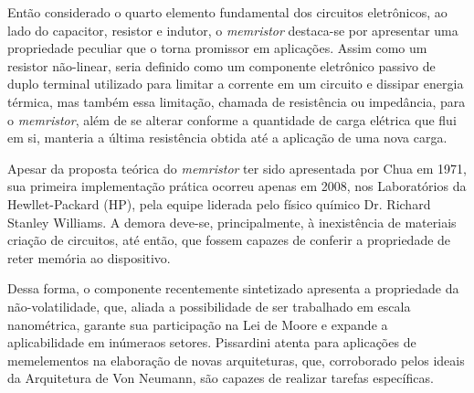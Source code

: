 \documentclass{ceel}
\begin{document}
\begin{multicols}{2}
Então considerado o quarto elemento fundamental dos circuitos eletrônicos, ao lado do capacitor, resistor e indutor, o \emph{memristor} destaca-se por apresentar uma propriedade peculiar que o torna promissor em aplicações. Assim como um resistor não-linear, seria definido como um componente eletrônico passivo de duplo terminal utilizado para limitar a corrente em um circuito e dissipar energia térmica, mas também essa limitação, chamada de resistência ou impedância, para o \emph{memristor}, além de se alterar conforme a quantidade de carga elétrica que flui em si, manteria a última resistência obtida até a aplicação de uma nova carga.

Apesar da proposta teórica do \emph{memristor} ter sido apresentada por Chua em 1971, sua primeira implementação prática ocorreu apenas em 2008, nos Laboratórios da Hewllet-Packard (HP), pela equipe liderada pelo físico químico Dr. Richard Stanley Williams. A demora deve-se, principalmente, à inexistência de materiais criação de circuitos, até então, que fossem capazes de conferir a propriedade de reter memória ao dispositivo.

Dessa forma, o componente recentemente sintetizado apresenta a propriedade da não-volatilidade, que, aliada a possibilidade de ser trabalhado em escala nanométrica, garante sua participação na Lei de Moore e expande a aplicabilidade em inúmeraos setores.
Pissardini \cite{memcomputacao} atenta para aplicações de memelementos na elaboração de novas arquiteturas, que, corroborado pelos ideais da Arquitetura de Von Neumann, são capazes de realizar tarefas específicas. 

\end{multicols}
\end{document}
